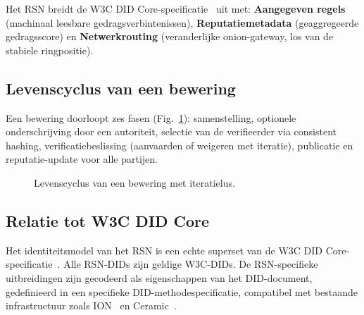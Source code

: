\documentclass[11pt,a4paper,twocolumn]{article}
\begin{document}
Het RSN breidt de W3C DID Core-specificatie~\cite{did2022} uit met: \textbf{Aangegeven regels} (machinaal leesbare gedragsverbintenissen), \textbf{Reputatiemetadata} (geaggregeerde gedragsscore) en \textbf{Netwerkrouting} (veranderlijke onion-gateway, los van de stabiele ringpositie).

\subsection{Levenscyclus van een bewering}

Een bewering doorloopt zes fasen (Fig.~\ref{fig:lifecycle}): samenstelling, optionele onderschrijving door een autoriteit, selectie van de verifieerder via consistent hashing, verificatiebeslissing (aanvaarden of weigeren met iteratie), publicatie en reputatie-update voor alle partijen.

\begin{figure}[ht]
\centering
{}
\caption{Levenscyclus van een bewering met iteratielus.}
\label{fig:lifecycle}
\end{figure}

\subsection{Relatie tot W3C DID Core}

Het identiteitsmodel van het RSN is een echte superset van de W3C DID Core-specificatie~\cite{did2022}. Alle RSN-DIDs zijn geldige W3C-DIDs. De RSN-specifieke uitbreidingen zijn gecodeerd als eigenschappen van het DID-document, gedefinieerd in een specifieke DID-methodespecificatie, compatibel met bestaande infrastructuur zoals ION~\cite{buchner2021} en Ceramic~\cite{ceramic2023}.
\end{document}
